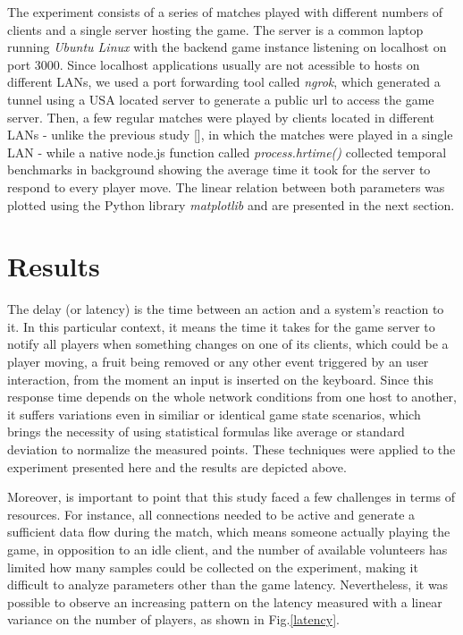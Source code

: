 \documentclass[english]{sbrt}
\begin{document}
The experiment consists of a series of matches played with different numbers of clients and a single server hosting the game.
The server is a common laptop running \textit{Ubuntu Linux} with the backend game instance listening on localhost on port 3000. Since localhost applications usually are not acessible to hosts on different LANs, we used a port forwarding tool called \textit{ngrok}, which generated a tunnel using a USA located server to generate a public url to access the game server. Then, a few regular matches were played by clients located in different LANs - unlike the previous study [], in which the matches were played in a single LAN - while a native node.js function called \textit{process.hrtime()} collected temporal benchmarks in background showing the average time it took for the server to respond to every player move. The linear relation between both parameters was plotted using the Python library \textit{matplotlib} and are presented in the next section.

\section{\textbf{Results}}

The delay (or latency) is the time between an action and a system's reaction to it. In this particular context, it means the time it takes for the game server to notify all players when something changes on one of its clients, which could be a player moving, a fruit being removed or any other event triggered by an user interaction, from the moment an input is inserted on the keyboard. Since this response time depends on the whole network conditions from one host to another, it suffers variations even in similiar or identical game state scenarios, which brings the necessity of using statistical formulas like average or standard deviation to normalize the measured points. These techniques were applied to the experiment presented here and the results are depicted above.

Moreover, is important to point that this study faced a few challenges in terms of resources. For instance, all connections needed to be active and generate a sufficient data flow during the match, which means someone actually playing the game, in opposition to an idle client, and the number of available volunteers has limited how many samples could be collected on the experiment, making it difficult to analyze parameters other than the game latency. Nevertheless, it was possible to observe an increasing pattern on the latency measured with a linear variance on the number of players, as shown in Fig.\ref{latency}.
\end{document}
